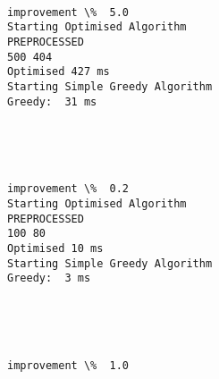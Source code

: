 \documentclass[11pt]{article}
\begin{document}
    \begin{center}
    \end{center}
    { \hspace*{\fill} \\}
    
    \begin{Verbatim}[commandchars=\\\{\}]
improvement \%  5.0
Starting Optimised Algorithm
PREPROCESSED
500 404
Optimised 427 ms
Starting Simple Greedy Algorithm
Greedy:  31 ms

    \end{Verbatim}

    \begin{center}
    \end{center}
    { \hspace*{\fill} \\}
    
    \begin{center}
    \end{center}
    { \hspace*{\fill} \\}
    
    \begin{Verbatim}[commandchars=\\\{\}]
improvement \%  0.2
Starting Optimised Algorithm
PREPROCESSED
100 80
Optimised 10 ms
Starting Simple Greedy Algorithm
Greedy:  3 ms

    \end{Verbatim}

    \begin{center}
    \end{center}
    { \hspace*{\fill} \\}
    
    \begin{center}
    \end{center}
    { \hspace*{\fill} \\}
    
    \begin{Verbatim}[commandchars=\\\{\}]
improvement \%  1.0

    \end{Verbatim}
\end{document}
